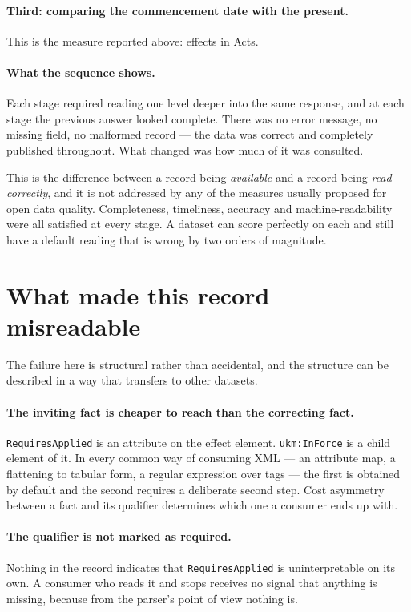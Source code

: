 \documentclass[11pt]{article}
\begin{document}
\paragraph{Third: comparing the commencement date with the present.} This is
the measure reported above: \nEffects{} effects in \nActsAffected{} Acts.

\paragraph{What the sequence shows.} Each stage required reading one level
deeper into the same response, and at each stage the previous answer looked
complete. There was no error message, no missing field, no malformed record ---
the data was correct and completely published throughout. What changed was how
much of it was consulted.

This is the difference between a record being \emph{available} and a record
being \emph{read correctly}, and it is not addressed by any of the measures
usually proposed for open data quality. Completeness, timeliness, accuracy and
machine-readability were all satisfied at every stage. A dataset can score
perfectly on each and still have a default reading that is wrong by two orders
of magnitude.

\section{What made this record misreadable}

The failure here is structural rather than accidental, and the structure can be
described in a way that transfers to other datasets.

\paragraph{The inviting fact is cheaper to reach than the correcting fact.}
\texttt{RequiresApplied} is an attribute on the effect element.
\texttt{ukm:InForce} is a child element of it. In every common way of consuming
XML --- an attribute map, a flattening to tabular form, a regular expression
over tags --- the first is obtained by default and the second requires a
deliberate second step. Cost asymmetry between a fact and its qualifier
determines which one a consumer ends up with.

\paragraph{The qualifier is not marked as required.} Nothing in the record
indicates that \texttt{RequiresApplied} is uninterpretable on its own. A
consumer who reads it and stops receives no signal that anything is missing,
because from the parser's point of view nothing is.
\end{document}
